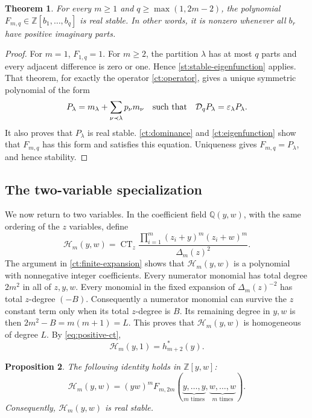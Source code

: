 \documentclass[reqno, 12pt]{article}
\numberwithin{equation}{section}
\newtheorem{theorem}{Theorem}[section]
\newtheorem{proposition}[theorem]{Proposition}
\theoremstyle{definition}
\DeclareMathOperator{\CT}{CT}
\begin{document}
\begin{theorem}\label{ct:universal-stability}
For every $m\geq1$ and $q\geq\max(1,2m-2)$, the polynomial
$F_{m,q}\in\mathbb Z[b_1,\ldots,b_q]$ is real stable.  In
other words, it is nonzero whenever all $b_r$ have positive imaginary parts.
\end{theorem}

\begin{proof}
For $m=1$, $F_{1,q}=1$.  For $m\geq2$, the partition
$\lambda$ has at most $q$ parts and every adjacent difference
is zero or one.  Hence \cref{st:stable-eigenfunction} applies.
That theorem, for exactly the operator \eqref{ct:operator},
gives a unique symmetric polynomial of the form
\[
 P_\lambda=m_\lambda+\sum_{\nu\prec\lambda}p_\nu m_\nu
 \quad\hbox{such that}\quad
 \mathcal D_qP_\lambda=\varepsilon_\lambda P_\lambda.
\]
It also proves that $P_\lambda$ is real stable. \cref{ct:dominance} and \cref{ct:eigenfunction}
show that $F_{m,q}$ has this form and satisfies this equation.
Uniqueness gives $F_{m,q}=P_\lambda$, and hence stability.
\end{proof}

\subsection{The two-variable specialization}

We now return to two variables.  In the coefficient field
$\mathbb Q(y,w)$, with the same ordering of the $z$ variables,
define
\begin{equation}\label{ct:homogeneous-numerator}
\mathcal H_m(y,w)=\CT_z\frac{\prod_{i=1}^m(z_i+y)^m(z_i+w)^m}{\Delta_m(z)^2}.
\end{equation}
The argument in \cref{ct:finite-expansion} shows that $\mathcal H_m(y,w)$ is a polynomial with nonnegative integer coefficients.
Every numerator monomial has total degree $2m^2$ in all of $z,y,w$.  Every monomial in the fixed
expansion of $\Delta_m(z)^{-2}$ has total $z$-degree $(-B)$.
Consequently a numerator monomial can survive the $z$ constant
term only when its total $z$-degree is $B$.  Its remaining degree
in $y,w$ is then $2m^2-B=m(m+1)=L$.  This proves that
$\mathcal H_m(y,w)$ is homogeneous of degree $L$.  By
\eqref{eq:positive-ct},
\[
 \mathcal H_m(y,1)=h_{m+2}^*(y).
\]

\begin{proposition}\label{ct:specialization}
The following identity holds in $\mathbb Z[y,w]$:
\begin{equation}\label{ct:specialization-identity}
 \mathcal H_m(y,w)
 =(yw)^mF_{m,2m}(
 \underbrace{y,\ldots,y}_{m\text{ times}},
 \underbrace{w,\ldots,w}_{m\text{ times}}).
\end{equation}
Consequently, $\mathcal H_m(y,w)$ is real stable.
\end{proposition}
\end{document}
